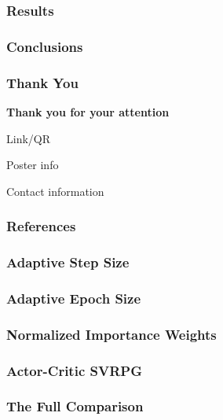 \documentclass[aspectratio=169]{beamer}
\newcommand{\enb}[1]{\textcolor{poliblue1}{\textbf{#1}}}
\begin{document}
\begin{frame} 
\frametitle{Results} 


\end{frame}

\begin{frame} 
\frametitle{Conclusions} 


\end{frame}


\begin{frame} 
\frametitle{Thank You} 
\begin{center}
	\Large{\enb{Thank you for your attention}}
\end{center}

Link/QR

Poster info

Contact information

\end{frame}


\begin{frame}
\frametitle{References}

\end{frame}

\begin{frame} 
\frametitle{Adaptive Step Size} 


\end{frame}

\begin{frame} 
\frametitle{Adaptive Epoch Size} 


\end{frame}

\begin{frame} 
\frametitle{Normalized Importance Weights} 


\end{frame}

\begin{frame} 
\frametitle{Actor-Critic SVRPG} 


\end{frame}

\begin{frame} 
\frametitle{The Full Comparison} 


\end{frame}
\end{document}
